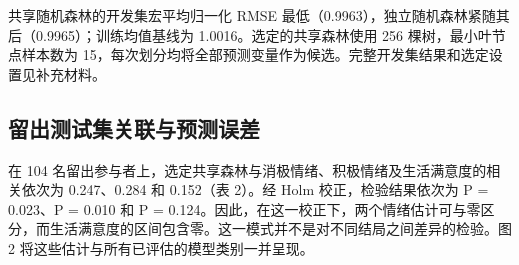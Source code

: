 \documentclass[11pt,letterpaper]{article}
\begin{document}
共享随机森林的开发集宏平均归一化 RMSE 最低（0.9963），独立随机森林紧随其后（0.9965）；训练均值基线为 1.0016。选定的共享森林使用 256 棵树，最小叶节点样本数为 15，每次划分均将全部预测变量作为候选。完整开发集结果和选定设置见补充材料。

\subsection{留出测试集关联与预测误差}\label{ux7559ux51faux6d4bux8bd5ux96c6ux5173ux8054ux4e0eux9884ux6d4bux8befux5dee}

在 104 名留出参与者上，选定共享森林与消极情绪、积极情绪及生活满意度的相关依次为 0.247、0.284 和 0.152（表 2）。经 Holm 校正，检验结果依次为 P = 0.023、P = 0.010 和 P = 0.124。因此，在这一校正下，两个情绪估计可与零区分，而生活满意度的区间包含零。这一模式并不是对不同结局之间差异的检验。图 2 将这些估计与所有已评估的模型类别一并呈现。
\end{document}
